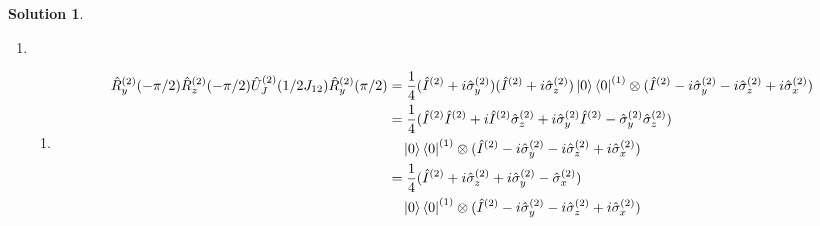 \documentclass[10pt]{article}
\theoremstyle{definition}
\newtheorem{soln}{Solution}
\begin{document}
\begin{soln}
\begin{enumerate}[label=(\alph*)]
\begin{enumerate}[label=(\arabic*)]
            \item \begin{align*}
                    \hat{R}_z^{(2)}(-\pi/2)\hat{U}_J^{(2)}(1/2J_{12})\hat{R}_y^{(2)}(\pi/2) & =_{(1)}\frac{1}{2\sqrt{2}}(\hat{I}^{(2)}+i\hat{\sigma}_z^{(2)})\ket{1}\bra{1}^{(1)}\otimes(\hat{I}^{(2)}-i\hat{\sigma}_y^{(2)}+i\hat{\sigma}_z^{(2)}-i\hat{\sigma}_x^{(2)}) \\
                  \end{align*}
          \end{enumerate}
    \item  ~\begin{enumerate}[label=(\arabic*)]
            \item \begin{align*}
                    \hat{R}_y^{(2)}(-\pi/2)\hat{R}_z^{(2)}(-\pi/2)\hat{U}_J^{(2)}(1/2J_{12})\hat{R}_y^{(2)}(\pi/2) & = \frac{1}{4}(\hat{I}^{(2)}+i\hat{\sigma}_y^{(2)})(\hat{I}^{(2)}+i\hat{\sigma}_z^{(2)})\ket{0}\bra{0}^{(1)}\otimes(\hat{I}^{(2)}-i\hat{\sigma}_y^{(2)}-i\hat{\sigma}_z^{(2)}+i\hat{\sigma}_x^{(2)}) \\
                                                                                                                   & = \frac{1}{4}(\hat{I}^{(2)}\hat{I}^{(2)}+i\hat{I}^{(2)}\hat{\sigma}_z^{(2)}+i\hat{\sigma}_y^{(2)}\hat{I}^{(2)}-\hat{\sigma}_y^{(2)}\hat{\sigma}_z^{(2)})                                            \\
                                                                                                                   & \quad\ket{0}\bra{0}^{(1)}\otimes(\hat{I}^{(2)}-i\hat{\sigma}_y^{(2)}-i\hat{\sigma}_z^{(2)}+i\hat{\sigma}_x^{(2)})                                                                                   \\
                                                                                                                   & = \frac{1}{4}(\hat{I}^{(2)}+i\hat{\sigma}_z^{(2)}+i\hat{\sigma}_y^{(2)}-\hat{\sigma}_x^{(2)})                                                                                                       \\
                                                                                                                   & \quad\ket{0}\bra{0}^{(1)}\otimes(\hat{I}^{(2)}-i\hat{\sigma}_y^{(2)}-i\hat{\sigma}_z^{(2)}+i\hat{\sigma}_x^{(2)})                                                                                   \\
                  \end{align*}

\end{enumerate}
\end{enumerate}
\end{soln}
\end{document}
